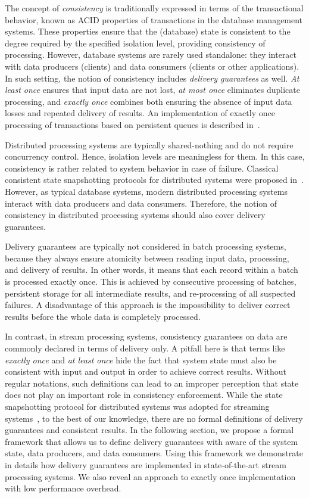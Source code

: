 \label{fs-preliminaries}

The concept of {\em consistency} is traditionally expressed in terms of the transactional behavior, known as ACID properties of transactions in the database management systems. These properties ensure that the (database) state is consistent to the degree required by the specified isolation level, providing consistency of processing. However, database systems are rarely used standalone: they interact with data producers (clients) and data consumers (clients or other applications). In such setting, the notion of consistency includes {\em delivery guarantees} as well. {\em At least once}  ensures that input data are not lost, {\em at most once} eliminates duplicate processing, and {\em exactly once} combines both ensuring the absence of input data losses and repeated delivery of results. An implementation of exactly once processing of transactions based on persistent queues is described in~\cite{DBLP:books/mk/WeikumV2002}.

Distributed processing systems are typically shared-nothing and do not require concurrency control. Hence, isolation levels are meaningless for them. In this case, consistency is rather related to system behavior in case of failure. Classical consistent state snapshotting protocols for distributed systems were proposed in~\cite{Chandy:1985:DSD:214451.214456}. However, as typical database systems, modern distributed processing systems interact with data producers and data consumers. Therefore, the notion of consistency in distributed processing systems should also cover delivery guarantees.

Delivery guarantees are typically not considered in batch processing systems, because they always ensure atomicity between reading input data, processing, and delivery of results. In other words, it means that each record within a batch is processed exactly once. This is achieved by consecutive processing of batches, persistent storage for all intermediate results, and re-processing of all suspected failures. A disadvantage of this approach is the impossibility to deliver correct results before the whole data is completely processed.

In contrast, in stream processing systems, consistency guarantees on data are commonly declared in terms of delivery only. A pitfall here is that terms like {\em exactly once} and {\em at least once} hide the fact that system state must also be consistent with input and output in order to achieve correct results. Without regular notations, such definitions can lead to an improper perception that state does not play an important role in consistency enforcement. While the state snapshotting protocol for distributed systems was adopted for streaming systems~\cite{2015arXiv150608603C}, to the best of our knowledge, there are no formal definitions of delivery guarantees and consistent results. In the following section, we propose a formal framework that allows us to define delivery guarantees with aware of the system state, data producers, and data consumers. Using this framework we demonstrate in details how delivery guarantees are implemented in state-of-the-art stream processing systems. We also reveal an approach to exactly once implementation with low performance overhead. 